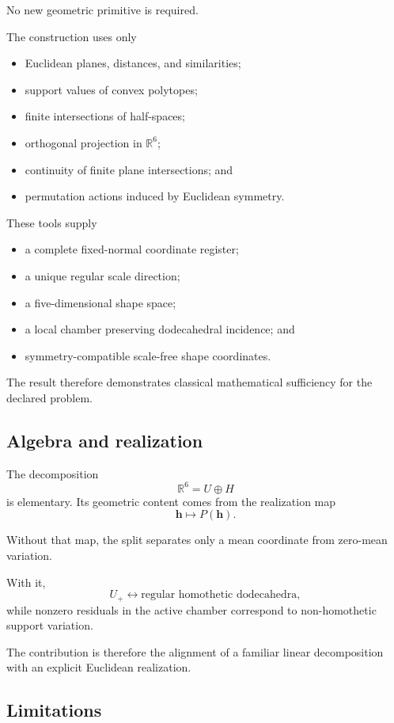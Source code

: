 No new geometric primitive is required.

The construction uses only

\begin{itemize}
\item Euclidean planes, distances, and similarities;
\item support values of convex polytopes;
\item finite intersections of half-spaces;
\item orthogonal projection in \(\mathbb R^6\);
\item continuity of finite plane intersections; and
\item permutation actions induced by Euclidean symmetry.
\end{itemize}

These tools supply

\begin{itemize}
\item a complete fixed-normal coordinate register;
\item a unique regular scale direction;
\item a five-dimensional shape space;
\item a local chamber preserving dodecahedral incidence; and
\item symmetry-compatible scale-free shape coordinates.
\end{itemize}

The result therefore demonstrates classical mathematical sufficiency for
the declared problem.

\subsection{Algebra and realization}

The decomposition
\[
\mathbb R^6=U\oplus H
\]
is elementary. Its geometric content comes from the realization map
\[
\mathbf h\longmapsto P(\mathbf h).
\]

Without that map, the split separates only a mean coordinate from zero-mean
variation.

With it,
\[
U_+
\longleftrightarrow
\text{regular homothetic dodecahedra},
\]
while nonzero residuals in the active chamber correspond to
non-homothetic support variation.

The contribution is therefore the alignment of a familiar linear
decomposition with an explicit Euclidean realization.

\subsection{Limitations}

